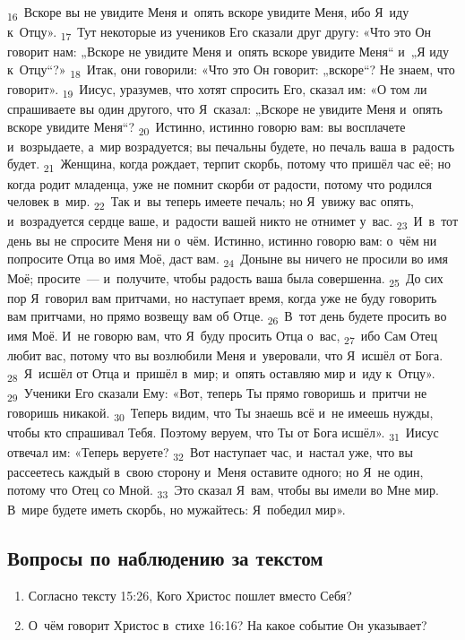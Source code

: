 \documentclass[a4paper,12pt]{article}
\begin{document}
\textsubscript{16}~Вскоре вы не увидите Меня и~опять вскоре увидите Меня, ибо Я~иду к~Отцу».
\textsubscript{17}~Тут некоторые из учеников Его сказали друг другу: «Что это Он говорит нам: „Вскоре не увидите Меня и~опять вскоре увидите Меня“ и~„Я иду к~Отцу“?»
\textsubscript{18}~Итак, они говорили: «Что это Он говорит: „вскоре“? Не знаем, что говорит».
\textsubscript{19}~Иисус, уразумев, что хотят спросить Его, сказал им: «О том ли спрашиваете вы один другого, что Я~сказал: „Вскоре не увидите Меня и~опять вскоре увидите Меня“?
\textsubscript{20}~Истинно, истинно говорю вам: вы восплачете и~возрыдаете, а~мир возрадуется; вы печальны будете, но печаль ваша в~радость будет.
\textsubscript{21}~Женщина, когда рождает, терпит скорбь, потому что пришёл час её; но когда родит младенца, уже не помнит скорби от радости, потому что родился человек в~мир.
\textsubscript{22}~Так и~вы теперь имеете печаль; но Я~увижу вас опять, и~возрадуется сердце ваше, и~радости вашей никто не отнимет у~вас.
\textsubscript{23}~И~в~тот день вы не спросите Меня ни о~чём. Истинно, истинно говорю вам: о~чём ни попросите Отца во имя Моё, даст вам.
\textsubscript{24}~Доныне вы ничего не просили во имя Моё; просите~--- и~получите, чтобы радость ваша была совершенна.
\textsubscript{25}~До сих пор Я~говорил вам притчами, но наступает время, когда уже не буду говорить вам притчами, но прямо возвещу вам об Отце.
\textsubscript{26}~В~тот день будете просить во имя Моё. И~не говорю вам, что Я~буду просить Отца о~вас,
\textsubscript{27}~ибо Сам Отец любит вас, потому что вы возлюбили Меня и~уверовали, что Я~исшёл от Бога.
\textsubscript{28}~Я~исшёл от Отца и~пришёл в~мир; и~опять оставляю мир и~иду к~Отцу».
\textsubscript{29}~Ученики Его сказали Ему: «Вот, теперь Ты прямо говоришь и~притчи не говоришь никакой.
\textsubscript{30}~Теперь видим, что Ты знаешь всё и~не имеешь нужды, чтобы кто спрашивал Тебя. Поэтому веруем, что Ты от Бога исшёл».
\textsubscript{31}~Иисус отвечал им: «Теперь веруете?
\textsubscript{32}~Вот наступает час, и~настал уже, что вы рассеетесь каждый в~свою сторону и~Меня оставите одного; но Я~не один, потому что Отец со Мной.
\textsubscript{33}~Это сказал Я~вам, чтобы вы имели во Мне мир. В~мире будете иметь скорбь, но мужайтесь: Я~победил мир». 

\subsection*{Вопросы по наблюдению за текстом}
\begin{enumerate}
    \item Согласно тексту 15:26, Кого Христос пошлет вместо Себя? 
    
    \myline
    
    \myline
    \item О~чём говорит Христос в~стихе 16:16? На какое событие Он указывает? 
    
    \myline
    
    \myline
\end{enumerate}
\end{document}
